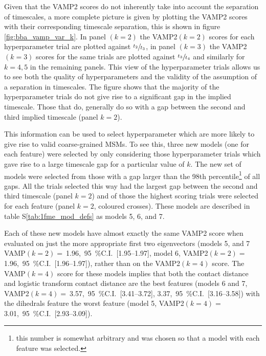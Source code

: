 \documentclass[journal=jacsat,manuscript=article]{achemso}
\newcommand{\numci}[3]{\num{#1},\ \SI{95}{\percent}C.I.\ [\numrange[range-phrase=---]{#2}{#3}]}
\newcommand*\sref[1]{%
    S\ref{#1}}
\begin{document}
Given that the VAMP2 scores do not inherently take into account the separation of timescales, a more complete picture is given by plotting the VAMP2 scores with their corresponding timescale separation, this is shown in figure \ref{fig:bba_vamp_var_k}.  In panel $(k=2)$ the VAMP2$(k=2)$ scores for each hyperparameter trial are plotted against $\sfrac{t_2}{t_3}$, in panel $(k=3)$ the VAMP2$(k=3)$ scores for the same trials are plotted against $\sfrac{t_3}{t_4}$ and similarly for $k=4, 5$ in the remaining panels. This view of the hyperparameter trials allows us to see both the quality of hyperparameters and the validity of the assumption of a separation in timescales.  The figure shows that the majority of the hyperparameter trials do not give rise to a significant gap in the implied timescale.  Those that do, generally do so with a gap between the second and third implied timescale (panel $k=2$).  

This information can be used to select hyperparameter which are more likely to give rise to valid coarse-grained MSMs.  To see this, three new models (one for each feature) were selected by only considering those hyperparameter trials which gave rise to a large timescale gap for a particular value of $k$.  The new set of  models were selected from those with a gap larger than the 98th percentile\footnote{this number is somewhat arbitrary and was chosen so that a model with each feature was selected.} of all gaps. All the trials selected this way had the largest gap between the second and third timescale (panel $k=2$) and of those the highest scoring trials were selected for each feature (panel $k=2$, coloured crosses). These models are described in table \sref{tab:1fme_mod_defs} as models 5, 6, and 7. 

Each of these new models have almost exactly the same VAMP2 score when evaluated on just the more appropriate first two eigenvectors  (models 5, and 7 VAMP$(k=2) =\ $\numci{1.96}{1.95}{1.97}, model 6, VAMP2$(k=2) =\ $\numci{1.96}{1.96}{1.97}), rather than on the VAMP2$(k=4)$ score.  The VAMP$(k=4)$ score for these models implies that both the contact distance and logistic transform contact distance are the best features (models 6 and 7, VAMP2$(k=4) =\ $\numci{3.57}{3.41}{3.72}, \numci{3.37}{3.16}{3.58}) with the dihedrals feature the worst feature (model 5, VAMP2$(k=4)=\ $\numci{3.01}{2.93}{3.09}).   
\end{document}
